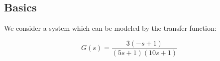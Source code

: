 \subsection{Basics}

We consider a system which can be modeled by the transfer function:

$$ G(s) = \frac{3(-s+1)}{(5s+1)(10s+1)} $$


% 
% 
